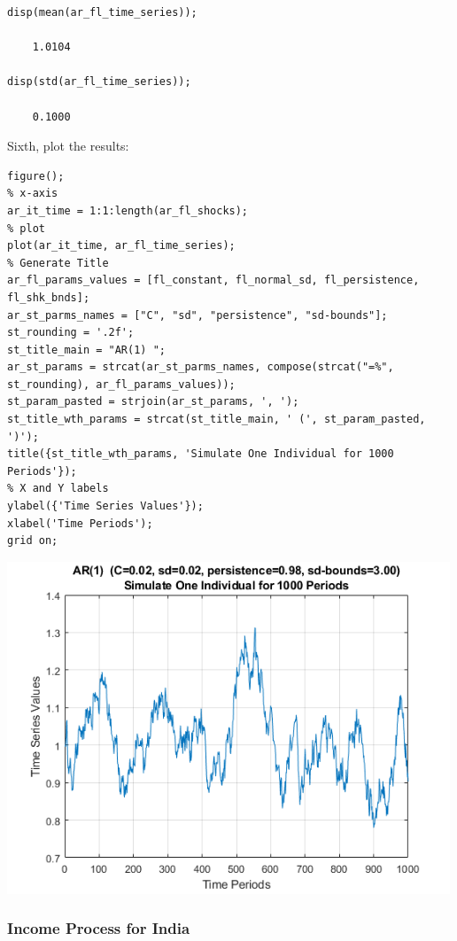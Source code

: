 \documentclass[
]{book}
\begin{document}
\begin{verbatim}
disp(mean(ar_fl_time_series));

    1.0104

disp(std(ar_fl_time_series));

    0.1000
\end{verbatim}

Sixth, plot the results:

\begin{verbatim}
figure();
% x-axis
ar_it_time = 1:1:length(ar_fl_shocks);
% plot
plot(ar_it_time, ar_fl_time_series);
% Generate Title
ar_fl_params_values = [fl_constant, fl_normal_sd, fl_persistence, fl_shk_bnds];
ar_st_parms_names = ["C", "sd", "persistence", "sd-bounds"];
st_rounding = '.2f';
st_title_main = "AR(1) ";
ar_st_params = strcat(ar_st_parms_names, compose(strcat("=%", st_rounding), ar_fl_params_values));
st_param_pasted = strjoin(ar_st_params, ', ');
st_title_wth_params = strcat(st_title_main, ' (', st_param_pasted, ')');
title({st_title_wth_params, 'Simulate One Individual for 1000 Periods'});
% X and Y labels
ylabel({'Time Series Values'});
xlabel('Time Periods');
grid on;
\end{verbatim}

\includegraphics[width=5.20833in,height=\textheight]{img/fs_autoregressive_images/figure_0.png}

\hypertarget{income-process-for-india}{%
\subsubsection{Income Process for India}\label{income-process-for-india}}
\end{document}
